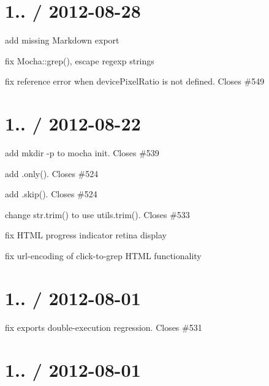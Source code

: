 \section*{1.. / 2012-\/08-\/28}


\begin{DoxyItemize}
\item add missing {\ttfamily Markdown} export
\item fix {\ttfamily Mocha\+::grep()}, escape regexp strings
\item fix reference error when {\ttfamily device\+Pixel\+Ratio} is not defined. Closes \#549
\end{DoxyItemize}

\section*{1.. / 2012-\/08-\/22}


\begin{DoxyItemize}
\item add mkdir -\/p to {\ttfamily mocha init}. Closes \#539
\item add {\ttfamily .only()}. Closes \#524
\item add {\ttfamily .skip()}. Closes \#524
\item change str.\+trim() to use utils.\+trim(). Closes \#533
\item fix H\+T\+ML progress indicator retina display
\item fix url-\/encoding of click-\/to-\/grep H\+T\+ML functionality
\end{DoxyItemize}

\section*{1.. / 2012-\/08-\/01}


\begin{DoxyItemize}
\item fix exports double-\/execution regression. Closes \#531
\end{DoxyItemize}

\section*{1.. / 2012-\/08-\/01}


